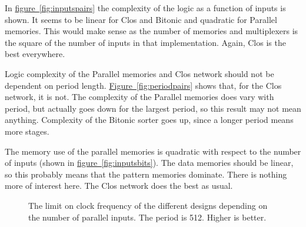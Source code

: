 \documentclass[
	utf8,
	largesmallcaps,
	intlimits,
	widermath,
	sharecounter,
	nobreak,
	definition=marks,
	numbers,
	noparts
]{rtthesis}
\newcommand{\figureref}[1]{\hyperref[#1]{figure~\ref*{#1}}}
\newcommand{\Figureref}[1]{\hyperref[#1]{Figure~\ref*{#1}}}
\begin{document}
In \figureref{fig:inputspairs} the complexity of the logic as a function of
inputs is shown. It seems to be linear for Clos and Bitonic and quadratic for
Parallel memories. This would make sense as the number of memories and
multiplexers is the square of the number of inputs in that implementation.
Again, Clos is the best everywhere.

Logic complexity of the Parallel memories and Clos network should not be
dependent on period length. \Figureref{fig:periodpairs} shows that, for the
Clos network, it is not. The complexity of the Parallel memories does vary with
period, but actually goes down for the largest period, so this result may not
mean anything. Complexity of the Bitonic sorter goes up, since a longer period
means more stages.

The memory use of the parallel memories is quadratic with respect to the number
of inputs (shown in \figureref{fig:inputsbits}). The data memories should be
linear, so this probably means that the pattern memories dominate. There is
nothing more of interest here. The Clos network does the best as usual.

\begin{figure}
\begin{center}
\end{center}
\caption{
The limit on clock frequency of the different designs depending on the number
of parallel inputs. The period is 512. Higher is better.
}
\label{fig:inputsmhz}
\end{figure}
\end{document}
